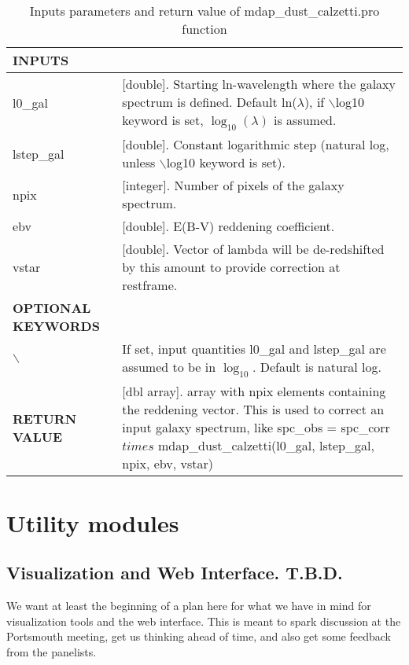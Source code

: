 \documentclass[11pt]{book}
\begin{document}
\begin{center}
\begin{longtable}{p{2.7cm}| p{11.1cm}}
\caption{Inputs parameters and return value of mdap\_dust\_calzetti.pro function} \label{dap_tab:mdap_dust_calzetti} \\
\hline
\endfirsthead
\hline
\endhead
\hline
\endlastfoot
\hline
{\bf  INPUTS}  & \\
\hline
l0\_gal & [double]. Starting ln-wavelength where the galaxy spectrum is defined. Default ln($\lambda$), if $\backslash$log10 keyword 
          is set, $\log_{10}(\lambda)$ is assumed. \\
%
lstep\_gal & [double]. Constant logarithmic step (natural log, unless  $\backslash$log10 keyword is set). \\
%
npix & [integer]. Number of pixels of the galaxy spectrum.\\
%
ebv & [double]. E(B-V) reddening coefficient.\\
%
vstar & [double]. Vector of lambda will be de-redshifted by this amount to provide correction at restframe.\\
\hline
{\bf  OPTIONAL KEYWORDS} & \\
$\backslash$ &  If set, input quantities l0\_gal and lstep\_gal are assumed to be in $\log_{10}$. Default is natural log.\\
\hline
{\bf  RETURN VALUE} & [dbl array]. array with npix elements containing the reddening vector. This is used to correct an input galaxy spectrum, like
spc\_obs = spc\_corr $times$ mdap\_dust\_calzetti(l0\_gal, lstep\_gal, npix, ebv, vstar)\\
\end{longtable}
\end{center}


\chapter{Utility modules}







\section{Visualization and Web Interface. T.B.D.}
\label{dap_sec:visualization}

We want at least the beginning of a plan here for what we have in mind
for visualization tools and the web interface.  This is meant to spark
discussion at the Portsmouth meeting, get us thinking ahead of time,
and also get some feedback from the panelists.
\end{document}
